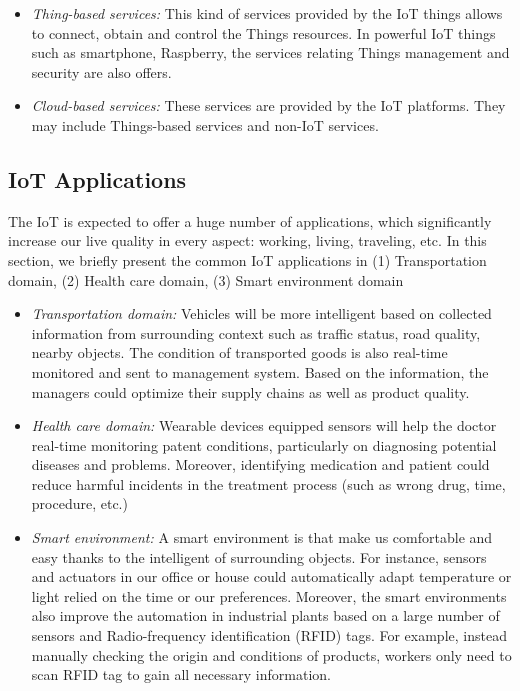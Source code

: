 \begin{itemize}

    \item \textit{Thing-based services: } This kind of services provided by the IoT things allows to connect, obtain and control the Things resources. In powerful IoT things such as smartphone, Raspberry, the services relating Things management and security are also offers. 
    
    \item \textit{Cloud-based services: } These services are provided by the IoT platforms. They may include Things-based services and non-IoT services.
    
\end{itemize}

\subsection{IoT Applications}

The IoT is expected to offer a huge number of applications, which significantly increase our live quality in every aspect: working, living, traveling, etc. In this section, we briefly present the common IoT applications in (1) Transportation domain, (2) Health care domain, (3) Smart environment domain

\begin{itemize}

    \item \textit{Transportation domain: } Vehicles will be more intelligent based on collected information from surrounding context such as traffic status, road quality, nearby objects. The condition of transported goods is also real-time monitored and sent to management system. Based on the information, the managers could optimize their supply chains as well as product quality.
    
    \item \textit{Health care domain: } Wearable devices equipped sensors will help the doctor real-time monitoring patent conditions, particularly on diagnosing potential diseases and problems. Moreover, identifying medication and patient could reduce harmful incidents in the treatment process (such as wrong drug, time, procedure, etc.)
    
    \item \textit{Smart environment: } A smart environment is that make us comfortable and easy thanks to the intelligent of surrounding objects. For instance, sensors and actuators in our office or house could automatically adapt temperature or light relied on the time or our preferences. Moreover, the smart environments also improve the automation in industrial plants based on a large number of sensors and Radio-frequency identification (RFID)  tags. For example, instead manually checking the origin and conditions of products, workers only need to scan RFID tag to gain all necessary information.
    
\end{itemize}

